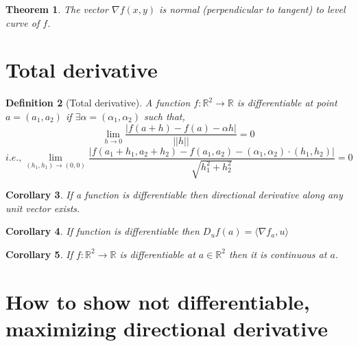 \documentclass[oneside,11pt,pdftex]{book}%
\numberwithin{equation}{section}
\newtheorem{theorem}{Theorem}[chapter]%
\newtheorem{corollary}[theorem]{Corollary}
\newtheorem{definition}[theorem]{Definition}
\numberwithin{section}{chapter}
\numberwithin{equation}{chapter}
\newcommand{\R}{\mathbb{R}}
\begin{document}
\begin{theorem}
	The vector $ \nabla f(x,y) $ is normal (perpendicular to tangent) to level curve of $ f $.
\end{theorem}

\section{Total derivative}
\begin{definition}[Total derivative]
	A function $ f: \R^2 \rightarrow \R $ is differentiable at point $ a=(a_1,a_2) $ if $ \exists \alpha=(\alpha_1,\alpha_2) $ such that,\[ \lim_{h \rightarrow 0} \frac{|f(a+h)-f(a)-\alpha h|}{||h||}=0 \]
	\[ i.e., \lim_{(h_1,h_1)\rightarrow (0,0)} \frac{|f(a_1+h_1,a_2+h_2)-f(a_1,a_2)-(\alpha_1,\alpha_2)\cdot(h_1,h_2)|}{\sqrt{h_1^2+h_2^2}} =0\]
\end{definition}
\begin{corollary}
	If a function is differentiable then directional derivative along any unit vector exists.
\end{corollary}
\begin{corollary}
	If function is differentiable then $ D_u f(a)=\langle \nabla f_a, u \rangle $
\end{corollary}
\begin{corollary}
	If $ f:\R^2 \rightarrow \R  $ is differentiable at $ a  \in \R^2 $ then it is continuous at $ a $.
\end{corollary}


\section{How to show not differentiable, maximizing directional derivative}
\end{document}
